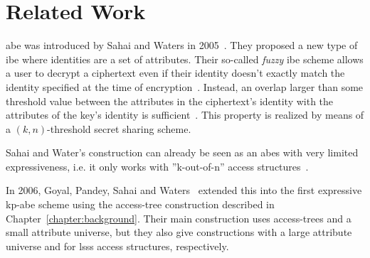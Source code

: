 \chapter{Related Work}



\acrlong{abe} was introduced by Sahai and Waters in 2005~\cite{sahai_fuzzy_2005}.
They proposed a new type of \gls{ibe} where identities are a set of attributes.
Their so-called \emph{fuzzy} \gls{ibe} scheme allows a user to decrypt a ciphertext even if their identity doesn't exactly match the identity specified at the time of encryption~\cite{sahai_fuzzy_2005}.
Instead, an overlap larger than some threshold value between the attributes in the ciphertext's identity with the attributes of the key's identity is sufficient~\cite{sahai_fuzzy_2005}.
This property is realized by means of a $(k, n)$-threshold secret sharing scheme.

Sahai and Water's construction can already be seen as an \acrshort{abes} with very limited expressiveness, i.e. it only works with ''k-out-of-n'' access structures~\cite{goyal_attribute-based_2006}.

In 2006, Goyal, Pandey, Sahai and Waters~\cite{goyal_attribute-based_2006} extended this into the first expressive \acrshort{kp-abe} scheme using the \gls{access-tree} construction described in Chapter~\ref{chapter:background}.
Their main construction uses \glspl{access-tree} and a small attribute universe, but they also give constructions with a large attribute universe and for \gls{lsss} access structures, respectively.


